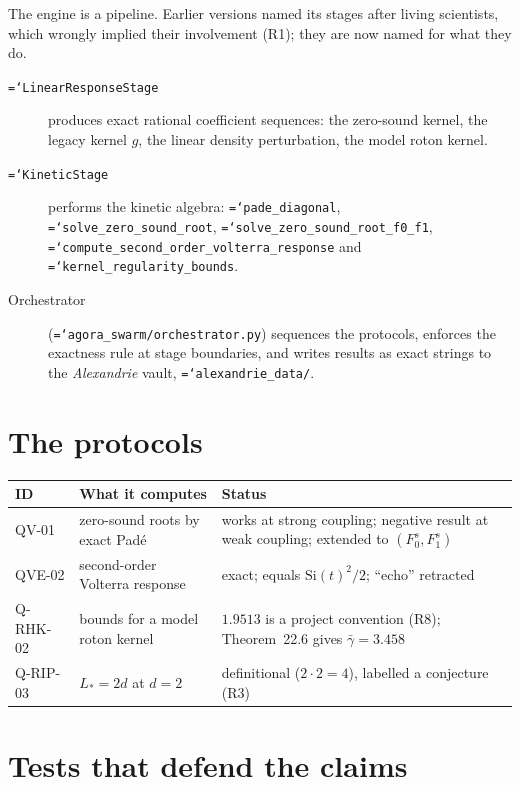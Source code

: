 \documentclass[11pt,a4paper,openany]{book}
\newcommand{\Fzs}{F_0^{s}}
\newcommand{\Fos}{F_1^{s}}
\newcommand{\code}[1]{\texttt{\hyphenchar\font=`\-\relax #1}}
\theoremstyle{definition}
\theoremstyle{plain}
\begin{document}
The engine is a pipeline. Earlier versions named its stages after living scientists, which
wrongly implied their involvement (R1); they are now named for what they do.
\begin{description}
  \item[\code{LinearResponseStage}] produces exact rational coefficient sequences: the zero-sound
        kernel, the legacy kernel $g$, the linear density perturbation, the model roton kernel.
  \item[\code{KineticStage}] performs the kinetic algebra: \code{pade\_diagonal},
        \code{solve\_zero\_sound\_root}, \code{solve\_zero\_sound\_root\_f0\_f1},
        \code{compute\_second\_order\_volterra\_response} and \code{kernel\_regularity\_bounds}.
  \item[Orchestrator] (\code{agora\_swarm/orchestrator.py}) sequences the protocols, enforces the
        exactness rule at stage boundaries, and writes results as exact strings to the
        \emph{Alexandrie} vault, \code{alexandrie\_data/}.
\end{description}

\section{The protocols}

\begin{center}
\small
\begin{tabular}{l>{\raggedright\arraybackslash}p{5.2cm}>{\raggedright\arraybackslash}p{5.4cm}}
\toprule
ID & What it computes & Status \\
\midrule
QV-01 & zero-sound roots by exact Padé & works at strong coupling; negative result at weak
coupling; extended to $(\Fzs,\Fos)$ \\
QVE-02 & second-order Volterra response & exact; equals $\mathrm{Si}(t)^2/2$; ``echo'' retracted \\
Q-RHK-02 & bounds for a model roton kernel & $1.9513$ is a project convention (R8); Theorem~22.6
gives $\bar\gamma=3.458$ \\
Q-RIP-03 & $L_*=2d$ at $d=2$ & definitional ($2\cdot2=4$), labelled a conjecture (R3) \\
\bottomrule
\end{tabular}
\end{center}

\section{Tests that defend the claims}
\end{document}
